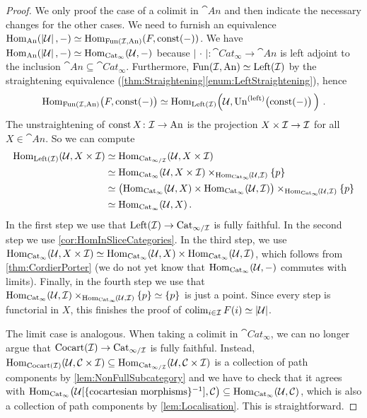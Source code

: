 \begin{proof}
	We only proof the case of a colimit in $\cat{An}$ and then indicate the necessary changes for the other cases. We need to furnish an equivalence $\operatorname{Hom}_{\mathrm{An}}\!\left(\left|\mathcal{U}\right|,-\right)\simeq \operatorname{Hom}_{\operatorname{Fun}(\mathcal{I},\mathrm{An})}\!\left(F,\operatorname{const}(-)\right)$. We have $\operatorname{Hom}_{\mathrm{An}}\!\left(\left|\mathcal{U}\right|,-\right)\simeq \operatorname{Hom}_{\mathrm{Cat}_\infty}(\mathcal{U},-)$ because $\left|\,\cdot\,\right|\colon \cat{Cat}_\infty\rightarrow\cat{An}$ is left adjoint to the inclusion $\cat{An}\subseteq\cat{Cat}_\infty$. Furthermore, $\operatorname{Fun}(\mathcal{I},\mathrm{An})\simeq\mathrm{Left}(\mathcal{I})$ by the straightening equivalence (\cref{thm:Straightening}\cref{enum:LeftStraightening}), hence
	\begin{equation*}
		\Hom_{\Fun(\Ii,\cat{An})}\lef(F,\const(-)\righ)\simeq \Hom_{\cat{Left}(\Ii)}\lef(\Uu,\operatorname{Un}^{(\mathrm{left})}\lef(\const(-)\righ)\righ)\,.
	\end{equation*}
	The unstraightening of $\operatorname{const} X\colon \mathcal{I}\rightarrow\mathrm{An}$ is the projection $X\times \mathcal{I}\rightarrow\mathcal{I}$ for all $X\in\cat{An}$. So we can compute
	\begin{align*}
		\operatorname{Hom}_{\mathrm{Left}(\mathcal{I})}\!\left(\mathcal{U},X\times\mathcal{I}\right)&\simeq \operatorname{Hom}_{\mathrm{Cat}_{\infty/\mathcal{I}}}\!\left(\mathcal{U},X\times\mathcal{I}\right)\\
		&\simeq \operatorname{Hom}_{\mathrm{Cat}_\infty}\!\left(\mathcal{U},X\times\mathcal{I}\right)\times_{\operatorname{Hom}_{\mathrm{Cat}_\infty}\!\left(\mathcal{U},\mathcal{I}\right)}\{p\}\\
		&\simeq \bigl(\operatorname{Hom}_{\mathrm{Cat}_\infty}(\mathcal{U},X)\times\operatorname{Hom}_{\mathrm{Cat}_\infty}(\mathcal{U},\mathcal{I})\bigr)\times_{\operatorname{Hom}_{\mathrm{Cat}_\infty}\!\left(\mathcal{U},\mathcal{I}\right)}\{p\}\\
		&\simeq \operatorname{Hom}_{\mathrm{Cat}_\infty}(\mathcal{U},X)\,.
	\end{align*}
	In the first step we use that $\mathrm{Left}(\mathcal{I})\rightarrow \mathrm{Cat}_{\infty/\mathcal{I}}$ is fully faithful. In the second step we use \cref{cor:HomInSliceCategories}. In the third step, we use $\operatorname{Hom}_{\mathrm{Cat}_\infty}\!\left(\mathcal{U},X\times\mathcal{I}\right)\simeq \operatorname{Hom}_{\mathrm{Cat}_\infty}(\mathcal{U},X)\times\operatorname{Hom}_{\mathrm{Cat}_\infty}(\mathcal{U},\mathcal{I})$, which follows from \cref{thm:CordierPorter} (we do not yet know that $\operatorname{Hom}_{\mathrm{Cat}_\infty}(\mathcal{U},-)$ commutes with limits). Finally, in the fourth step we use that $\operatorname{Hom}_{\mathrm{Cat}_\infty}(\mathcal{U},\mathcal{I})\times_{\operatorname{Hom}_{\mathrm{Cat}_\infty}\!\left(\mathcal{U},\mathcal{I}\right)}\{p\}\simeq \{p\}$ is just a point. Since every step is functorial in $X$, this finishes the proof of $\operatorname*{colim}_{i\in\mathcal{I}}F(i)\simeq \left|\mathcal{U}\right|$.
	
	The limit case is analogous. When taking a colimit in $\cat{Cat}_\infty$, we can no longer argue that $\mathrm{Cocart}(\mathcal{I})\rightarrow \mathrm{Cat}_{\infty/\mathcal{I}}$ is fully faithful. Instead, $\operatorname{Hom}_{\mathrm{Cocart}(\mathcal{I})}\!\left(\mathcal{U},\mathcal{C}\times\mathcal{I}\right)\subseteq \operatorname{Hom}_{\mathrm{Cat}_{\infty/\mathcal{I}}}\!\left(\mathcal{U},\mathcal{C}\times\mathcal{I}\right)$ is a collection of path components by \cref{lem:NonFullSubcategory} and we have to check that it agrees with $\operatorname{Hom}_{\mathrm{Cat}_\infty}\!\left(\mathcal{U}[\{\text{cocartesian morphisms}\}^{-1}],\mathcal{C}\right)\subseteq \operatorname{Hom}_{\mathrm{Cat}_\infty}\!\left(\mathcal{U},\mathcal{C}\right)$, which is also a collection of path components by \cref{lem:Localisation}. This is straightforward.
\end{proof}

